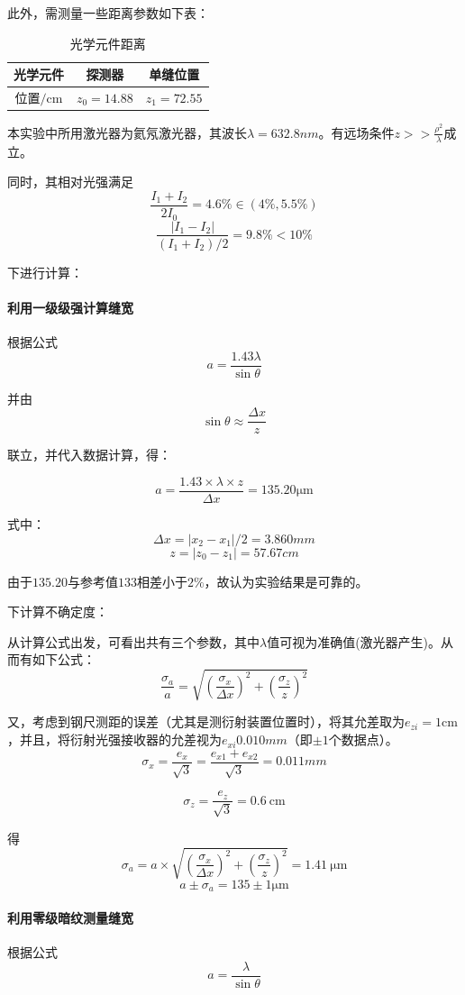 \documentclass{ctexart}
\begin{document}
  此外，需测量一些距离参数如下表：
\begin{table}[htbp]
  \centering
  \caption{光学元件距离}
    \begin{tabular}{|c|c|c|}\hline
    光学元件  & {探测器} & {单缝位置} \\ \hline
    位置$/\si{\centi\meter}$ & $z_0=14.88$ & $z_1=72.55$ \\\hline
    \end{tabular}%
  \label{tab:addlabel}%
\end{table}%



本实验中所用激光器为氦氖激光器，其波长$\lambda=632.8\si{nm}$。有远场条件$z>>\frac{\rho^2}{\lambda}$成立。

同时，其相对光强满足$$\frac{I_1+I_2}{2I_0}=4.6\%\in(4\%,5.5\%)$$
$$\frac{|I_1-I_2|}{(I_1+I_2)/2}=9.8\%<10\%$$

下进行计算：
\paragraph{利用一级级强计算缝宽}
根据公式
$$a=\frac{1.43\lambda}{\sin{\theta}}$$

并由$$\sin{\theta}\approx \frac{\Delta x}{z}$$

联立，并代入数据计算，得：

$$a=\frac{1.43 \times \lambda \times z}{\Delta x}=135.20\si{\micro \meter}$$


式中：$$\Delta x=|x_2-x_1|/2=3.860\si{mm}$$
$$z=|z_0-z_1|=57.67\si{cm}$$

由于$135.20\mbox{与参考值}133\mbox{相差小于}2\%$，故认为实验结果是可靠的。

下计算不确定度：

从计算公式出发，可看出共有三个参数，其中$\lambda$值可视为准确值(激光器产生)。从而有如下公式：
$$\frac{\sigma_a}a=\sqrt{(\frac{\sigma_x}{\Delta x})^2+(\frac{\sigma_z}z)^2}$$

又，考虑到钢尺测距的误差（尤其是测衍射装置位置时），将其允差取为$e_{zi}=1\si{\centi\meter} $，并且，将衍射光强接收器的允差视为$e_{xi}0.010\si{mm}$（即$\pm 1$个数据点）。
$$\sigma_x=\frac{e_x}{\sqrt{3}}=\frac{e_{x1}+e_{x2}}{\sqrt{3}}=0.011\si{mm}$$

$$\sigma_z=\frac{e_z}{\sqrt{3}}=\SI{0.6}{\centi\meter}$$

得$$\sigma_a=a\times\sqrt{(\frac{\sigma_x}{\Delta x})^2+(\frac{\sigma_z}z)^2}=\SI{1.41}{\micro \meter}  $$ 
$$a \pm \sigma_a=135\pm 1 \si{\micro \meter}$$
\paragraph{利用零级暗纹测量缝宽}
根据公式$$a=\frac{\lambda}{\sin{\theta}}$$
\end{document}
